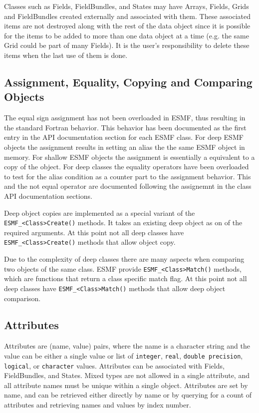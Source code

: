 Classes such as Fields, FieldBundles, and States may have Arrays, 
Fields, Grids and FieldBundles created externally and associated with
them.  These associated items are not destroyed along with the rest  
of the data object since it is possible for the items to be added 
to more than one data object at a time (e.g. the same Grid could 
be part of many Fields).  It is the user's responsibility to delete 
these items when the last use of them is done.

\subsection{Assignment, Equality, Copying and Comparing Objects}

The equal sign assignment has not been overloaded in ESMF, thus resulting in
the standard Fortran behavior. This behavior has been documented as the first
entry in the API documentation section for each ESMF class. For deep ESMF
objects the assignment results in setting an alias the the same ESMF object
in memory. For shallow ESMF objects the assignment is essentially a equivalent
to a copy of the object. For deep classes the equality operators have been
overloaded to test for the alias condition as a counter part to the assignment
behavior. This and the not equal operator are documented following the
assignemnt in the class API documentation sections. 

\begin{sloppypar}
Deep object copies are implemented as a special variant of the
{\tt ESMF\_<Class>Create()} methods. It takes an existing deep object as
on of the required arguments. At this point not all deep classes have
{\tt ESMF\_<Class>Create()} methods that allow object copy.
\end{sloppypar}

Due to the complexity of deep classes there are many aspects when comparing two
objects of the same class. ESMF provide {\tt ESMF\_<Class>Match()} methods,
which are functions that return a class specific match flag. At this point not
all deep classes have {\tt ESMF\_<Class>Match()} methods that allow deep object
comparison.

\subsection{Attributes}

Attributes are (name, value) pairs, where
the name is a character string and the value can be either a single
value or list of {\tt integer}, {\tt real}, {\tt double precision},
{\tt logical}, or {\tt character} values.
Attributes can be associated with Fields, FieldBundles, and States. 
Mixed types are not allowed in a single attribute, and all attribute
names must be unique within a single object.    Attributes are set
by name, and can be retrieved either directly by name or by querying
for a count of attributes and retrieving names and values
by index number.

